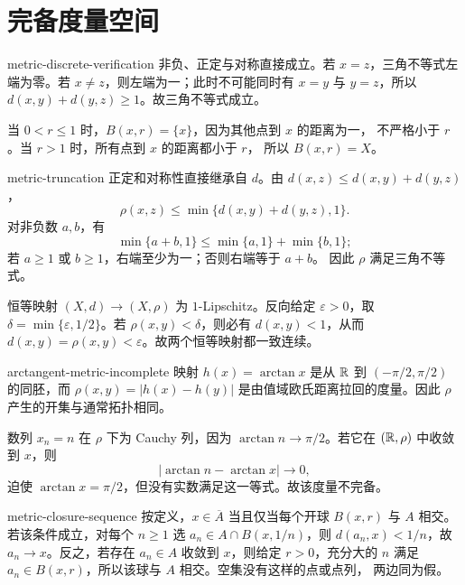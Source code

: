 \chapter{完备度量空间}
\label{chap:complete-metric-spaces-solutions}

\begin{solution}{metric-discrete-verification}
非负、正定与对称直接成立。若 \(x=z\)，三角不等式左端为零。若
\(x\ne z\)，则左端为一；此时不可能同时有 \(x=y\) 与 \(y=z\)，所以
\(d(x,y)+d(y,z)\ge1\)。故三角不等式成立。

当 \(0<r\le1\) 时，\(B(x,r)=\{x\}\)，因为其他点到 \(x\) 的距离为一，
不严格小于 \(r\)。当 \(r>1\) 时，所有点到 \(x\) 的距离都小于 \(r\)，
所以 \(B(x,r)=X\)。
\end{solution}

\begin{solution}{metric-truncation}
正定和对称性直接继承自 \(d\)。由 \(d(x,z)\le d(x,y)+d(y,z)\)，
\[
 \rho(x,z)\le\min\{d(x,y)+d(y,z),1\}.
\]
对非负数 \(a,b\)，有
\[
 \min\{a+b,1\}\le\min\{a,1\}+\min\{b,1\};
\]
若 \(a\ge1\) 或 \(b\ge1\)，右端至少为一；否则右端等于 \(a+b\)。
因此 \(\rho\) 满足三角不等式。

恒等映射 \((X,d)\to(X,\rho)\) 为 \(1\)-Lipschitz。反向给定
\(\varepsilon>0\)，取 \(\delta=\min\{\varepsilon,1/2\}\)。若
\(\rho(x,y)<\delta\)，则必有 \(d(x,y)<1\)，从而
\(d(x,y)=\rho(x,y)<\varepsilon\)。故两个恒等映射都一致连续。
\end{solution}

\begin{solution}{arctangent-metric-incomplete}
映射 \(h(x)=\arctan x\) 是从 \(\mathbb{R}\) 到
\((-\pi/2,\pi/2)\) 的同胚，而
\(\rho(x,y)=|h(x)-h(y)|\) 是由值域欧氏距离拉回的度量。因此
\(\rho\) 产生的开集与通常拓扑相同。

数列 \(x_n=n\) 在 \(\rho\) 下为 Cauchy 列，因为
\(\arctan n\to\pi/2\)。若它在 \((\mathbb{R},\rho)\) 中收敛到 \(x\)，则
\[
 |\arctan n-\arctan x|\to0,
\]
迫使 \(\arctan x=\pi/2\)，但没有实数满足这一等式。故该度量不完备。
\end{solution}

\begin{solution}{metric-closure-sequence}
按定义，\(x\in\overline A\) 当且仅当每个开球 \(B(x,r)\) 与 \(A\)
相交。若该条件成立，对每个 \(n\ge1\) 选
\(a_n\in A\cap B(x,1/n)\)，则
\(d(a_n,x)<1/n\)，故 \(a_n\to x\)。反之，若存在
\(a_n\in A\) 收敛到 \(x\)，则给定 \(r>0\)，充分大的 \(n\) 满足
\(a_n\in B(x,r)\)，所以该球与 \(A\) 相交。空集没有这样的点或点列，
两边同为假。
\end{solution}

